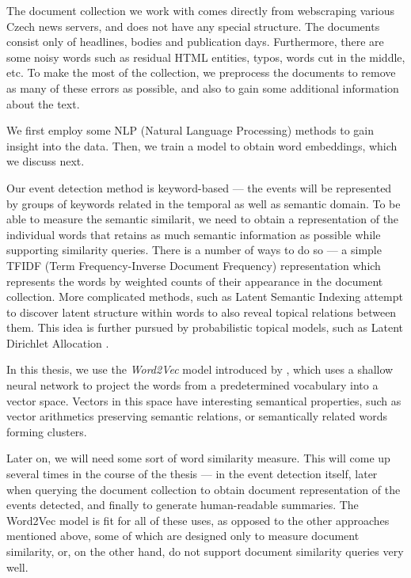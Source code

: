 The document collection we work with comes directly from webscraping various Czech news servers, and does not have any special structure. The documents consist only of headlines, bodies and publication days. Furthermore, there are some noisy words such as residual HTML entities, typos, words cut in the middle, etc. To make the most of the collection, we preprocess the documents to remove as many of these errors as possible, and also to gain some additional information about the text.

We first employ some NLP (Natural Language Processing) methods to gain insight into the data. Then, we train a model to obtain word embeddings, which we discuss next.

Our event detection method is keyword-based --- the events will be represented by groups of keywords related in the temporal as well as semantic domain. To be able to measure the semantic similarit, we need to obtain a representation of the individual words that retains as much semantic information as possible while supporting similarity queries. There is a number of ways to do so --- a simple TFIDF (Term Frequency-Inverse Document Frequency) representation \citep{tfidf, information-retrieval} which represents the words by weighted counts of their appearance in the document collection. More complicated methods, such as Latent Semantic Indexing \citep{lsi} attempt to discover latent structure within words to also reveal topical relations between them. This idea is further pursued by probabilistic topical models, such as Latent Dirichlet Allocation \citep{lda}.

In this thesis, we use the \textit{Word2Vec} model introduced by \cite{word2vec, distributed-representations, linguistic-regularities}, which uses a shallow neural network to project the words from a predetermined vocabulary into a vector space. Vectors in this space have interesting semantical properties, such as vector arithmetics preserving semantic relations, or semantically related words forming clusters.

Later on, we will need some sort of word similarity measure. This will come up several times in the course of the thesis --- in the event detection itself, later when querying the document collection to obtain document representation of the events detected, and finally to generate human-readable summaries. The Word2Vec model is fit for all of these uses, as opposed to the other approaches mentioned above, some of which are designed only to measure document similarity, or, on the other hand, do not support document similarity queries very well.


